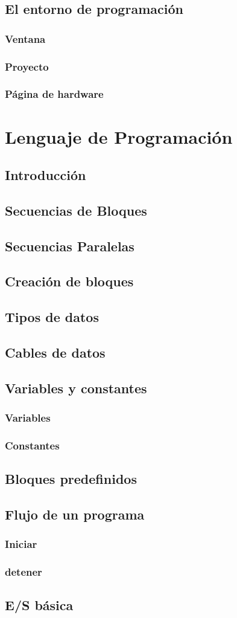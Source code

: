 \documentclass[12pt,a4paper]{article}
\begin{document}
\subsection{El entorno de programación}
\subsubsection{Ventana}
\subsubsection{Proyecto}
\subsubsection{Página de hardware}
\section{Lenguaje de Programación}
\subsection{Introducción}
\subsection{Secuencias de Bloques}
\subsection{Secuencias Paralelas}
\subsection{Creación de bloques}
\subsection{Tipos de datos}
\subsection{Cables de datos}
\subsection{Variables y constantes}
\subsubsection{Variables}
\subsubsection{Constantes}
\subsection{Bloques predefinidos}
\subsection{Flujo de un programa}
\subsubsection{Iniciar}
\subsubsection{detener}
\subsection{E/S básica}
\end{document}
